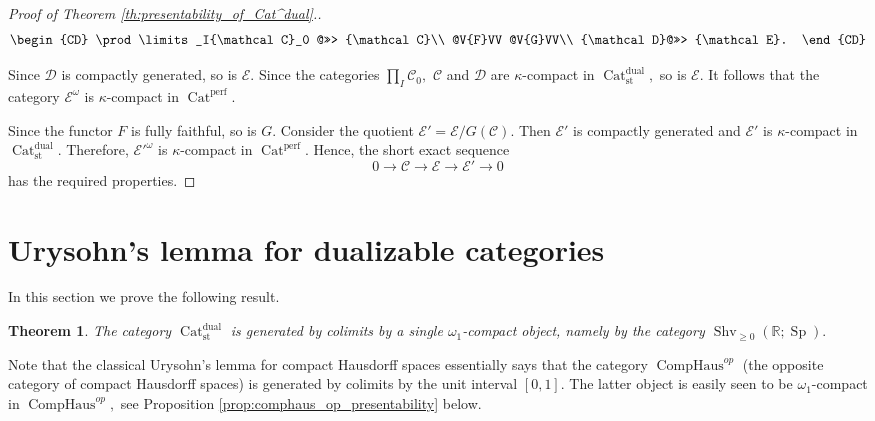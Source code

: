 \documentclass[11pt,leqno]{amsart}
\newtheorem{theo}{Theorem}[section]
\numberwithin{equation}{section}
\def\R{\mathbb{R}}
\newcommand{\comphaus}{\operatorname{CompHaus}}
\newcommand{\Cat}{\operatorname{Cat}}
\newcommand{\st}{\operatorname{st}}
\newcommand{\dual}{\operatorname{dual}}
\newcommand{\cD}{{\mathcal D}}
\newcommand{\cC}{{\mathcal C}}
\newcommand{\cE}{{\mathcal E}}
\newcommand{\perf}{\operatorname{perf}}
\newcommand{\Sh}{\operatorname{Shv}}
\newcommand{\Sp}{\operatorname{Sp}}
\begin{document}
\begin{proof}[Proof of Theorem \ref{th:presentability_of_Cat^dual}.]
$$
\begin{CD}
\prod\limits_I\cC_0 @>>> \cC\\
@V{F}VV @V{G}VV\\
\cD @>>> \cE.
\end{CD}
$$    

Since $\cD$ is compactly generated, so is $\cE.$ Since the categories $\prod\limits_I\cC_0,$ $\cC$ and $\cD$ are $\kappa$-compact in $\Cat_{\st}^{\dual},$ so is $\cE.$ It follows that the category $\cE^{\omega}$ is $\kappa$-compact in $\Cat^{\perf}.$

Since the functor $F$ is fully faithful, so is $G.$ Consider the quotient $\cE'=\cE/G(\cC).$ Then $\cE'$ is compactly generated and $\cE'$ is $\kappa$-compact in $\Cat_{\st}^{\dual}.$ Therefore, $\cE'^{\omega}$ is $\kappa$-compact in $\Cat^{\perf}.$ Hence, the short exact sequence
$$0\to\cC\to\cE\to\cE'\to 0$$ has the required properties.\end{proof} 



\section{Urysohn's lemma for dualizable categories}
\label{app:Urysohn}

In this section we prove the following result.

\begin{theo}\label{th:Urysohn_dualizable} The category $\Cat_{\st}^{\dual}$ is generated by colimits by a single $\omega_1$-compact object, namely by the category $\Sh_{\geq 0}(\R;\Sp).$\end{theo}

Note that the classical Urysohn's lemma for compact Hausdorff spaces essentially says that the category
$\comphaus^{op}$ (the opposite category of compact Hausdorff spaces) is generated by colimits by the unit interval $[0,1].$ The latter object is easily seen to be $\omega_1$-compact in $\comphaus^{op},$ see Proposition \ref{prop:comphaus_op_presentability} below.
\end{document}
